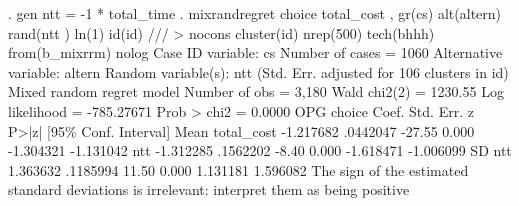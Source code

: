 . gen ntt = -1 * total_time
{\smallskip}
. mixrandregret choice  total_cost , gr(cs) alt(altern) rand(ntt ) ln(1) id(id) ///
> nocons cluster(id)  nrep(500) tech(bhhh) from(b_mixrrm) nolog
{\smallskip}
Case ID variable: cs                           Number of cases    =       1060
Alternative variable: altern                   
Random variable(s): ntt                        
{\smallskip}
                                 (Std. Err. adjusted for  106 clusters in id)
{\smallskip}
Mixed random regret model                       Number of obs     =      3,180
                                                Wald chi2(2)      =    1230.55
Log likelihood = -785.27671                     Prob > chi2       =     0.0000
{\smallskip}
             {\VBAR}                 OPG
      choice {\VBAR}      Coef.   Std. Err.      z    P>|z|     [95\% Conf. Interval]
Mean         {\VBAR}
  total_cost {\VBAR}  -1.217682   .0442047   -27.55   0.000    -1.304321   -1.131042
         ntt {\VBAR}  -1.312285   .1562202    -8.40   0.000    -1.618471   -1.006099
SD           {\VBAR}
         ntt {\VBAR}   1.363632   .1185994    11.50   0.000     1.131181    1.596082
{\smallskip}
The sign of the estimated standard deviations is irrelevant: interpret them as
being positive
